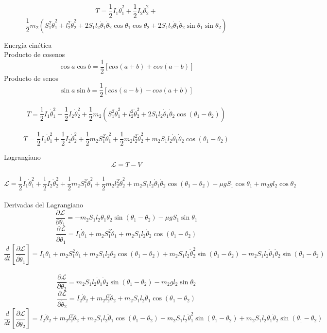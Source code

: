 \documentclass[10pt,a4papper]{article}
\begin{document}
\[T=\frac{1}{2}I_1\dot\theta_1^2+\frac{1}{2}I_2\dot\theta_2^2+\]
\[\frac{1}{2}m_2\left(S_1^2\dot\theta_1^2+l_2^2\dot\theta_2^2+2S_1l_2\dot\theta_1\dot\theta_2\cos\theta_1\cos\theta_2+2S_1l_2\dot\theta_1\dot\theta_2\sin\theta_1\sin\theta_2\right)\]


\newpage
Energía cinética\\
Producto de cosenos
\[\cos a\cos b=\frac{1}{2}\left[cos(a+b)+cos(a-b)\right]\]
Producto de senos
\[\sin a\sin b=\frac{1}{2}\left[cos(a-b)-cos(a+b)\right]\]\\
\[T=\frac{1}{2}I_1\dot\theta_1^2+\frac{1}{2}I_2\dot\theta_2^2+\frac{1}{2}m_2\left(S_1^2\dot\theta_1^2+l_2^2\dot\theta_2^2+2S_1l_2\dot\theta_1\dot\theta_2\cos(\theta_1-\theta_2)\right)\]\\

\[T=\frac{1}{2}I_1\dot\theta_1^2+\frac{1}{2}I_2\dot\theta_2^2+\frac{1}{2}m_2S_1^2\dot\theta_1^2+\frac{1}{2}m_2l_2^2\dot\theta_2^2+m_2S_1l_2\dot\theta_1\dot\theta_2\cos(\theta_1-\theta_2)\]

\newpage
Lagrangiano
\[\mathcal{L}=T-V\]\\
\[\mathcal{L}=\frac{1}{2}I_1\dot\theta_1^2+\frac{1}{2}I_2\dot\theta_2^2+\frac{1}{2}m_2S_1^2\dot\theta_1^2+\frac{1}{2}m_2l_2^2\dot\theta_2^2+m_2S_1l_2\dot\theta_1\dot\theta_2\cos(\theta_1-\theta_2)+\mu gS_1\cos\theta_1+m_2gl_2\cos\theta_2\]\\
Derivadas del Lagrangiano
\[\frac{\partial\mathcal{L}}{\partial\theta_1}=-m_2S_1l_2\dot\theta_1\dot\theta_2\sin(\theta_1-\theta_2)-\mu gS_1\sin\theta_1\]
\[\frac{\partial\mathcal{L}}{\partial\dot\theta_1}=I_1\dot\theta_1+m_2S_1^2\dot\theta_1+m_2S_1l_2\dot\theta_2\cos(\theta_1-\theta_2)\]
\[\frac{d}{dt}\left[\frac{\partial\mathcal{L}}{\partial\dot\theta_1}\right]=I_1\ddot\theta_1+m_2S_1^2\ddot\theta_1+m_2S_1l_2\ddot\theta_2\cos(\theta_1-\theta_2)+m_2S_1l_2\dot\theta_2^2\sin(\theta_1-\theta_2)-m_2S_1l_2\dot\theta_1\dot\theta_2\sin(\theta_1-\theta_2)\]\\

\[\frac{\partial\mathcal{L}}{\partial\theta_2}=m_2S_1l_2\dot\theta_1\dot\theta_2\sin(\theta_1-\theta_2)-m_2gl_2\sin\theta_2\]
\[\frac{\partial\mathcal{L}}{\partial\dot\theta_2}=I_2\dot\theta_2+m_2l_2^2\dot\theta_2+m_2S_1l_2\dot\theta_1\cos(\theta_1-\theta_2)\]
\[\frac{d}{dt}\left[\frac{\partial\mathcal{L}}{\partial\dot\theta_2}\right]=I_2\ddot\theta_2+m_2l_2^2\ddot\theta_2+m_2S_1l_2\ddot\theta_1\cos(\theta_1-\theta_2)-m_2S_1l_2\dot\theta_1^2\sin(\theta_1-\theta_2)+m_2S_1l_2\dot\theta_1\dot\theta_2\sin(\theta_1-\theta_2)\]
\end{document}
